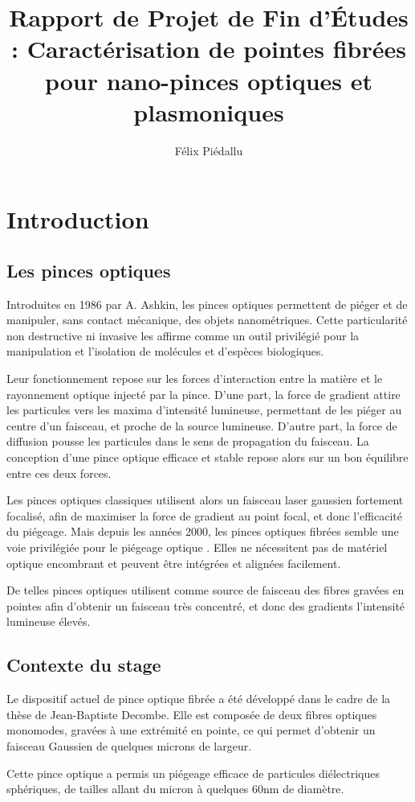 \documentclass[a4paper,12pt]{report}
\date{}
\title{Rapport de Projet de Fin d'Études : Caractérisation de pointes fibrées pour nano-pinces optiques et plasmoniques}
\author{Félix Piédallu}
\begin{document}
\nocite{*}


\chapter*{Introduction} %
\section*{Les pinces optiques}
Introduites en 1986 par A. Ashkin\cite{Ashkin}, les pinces optiques permettent de piéger et de manipuler, sans contact mécanique, des objets nanométriques. Cette particularité non destructive ni invasive les affirme comme un outil privilégié pour la manipulation et l'isolation de molécules et d'espèces biologiques.

Leur fonctionnement repose sur les forces d'interaction entre la matière et le rayonnement optique injecté par la pince. D'une part, la force de gradient attire les particules vers les maxima d'intensité lumineuse, permettant de les piéger au centre d'un faisceau, et proche de la source lumineuse. D'autre part, la force de diffusion pousse les particules dans le sens de propagation du faisceau. La conception d'une pince optique efficace et stable repose alors sur un bon équilibre entre ces deux forces.

Les pinces optiques classiques utilisent alors un faisceau laser gaussien fortement focalisé, afin de maximiser la force de gradient au point focal, et donc l'efficacité du piégeage. Mais depuis les années 2000, les pinces optiques fibrées semble une voie privilégiée pour le piégeage optique \cite{Taguchi,Taylor}. Elles ne nécessitent pas de matériel optique encombrant et peuvent être intégrées et alignées facilement.

De telles pinces optiques utilisent comme source de faisceau des fibres gravées en pointes afin d'obtenir un faisceau très concentré, et donc des gradients l'intensité lumineuse élevés.

\section*{Contexte du stage}
Le dispositif actuel de pince optique fibrée a été développé dans le cadre de la thèse de Jean-Baptiste Decombe\cite{Decombe}. Elle est composée de deux fibres optiques monomodes, gravées à une extrémité en pointe, ce qui permet d'obtenir un faisceau Gaussien de quelques microns de largeur.

Cette pince optique a permis un piégeage efficace de particules diélectriques sphériques, de tailles allant du micron à quelques 60nm de diamètre.
\end{document}
